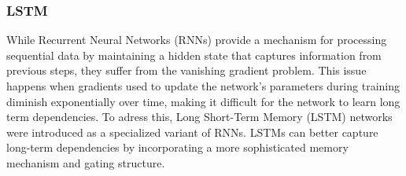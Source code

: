 \documentclass{article}
\begin{document}
\subsubsection{LSTM}

While Recurrent Neural Networks (RNNs) provide a mechanism for processing sequential data by maintaining a hidden state that captures information from previous steps, they suffer from the vanishing gradient problem.
This issue happens when gradients used to update the network's parameters during training diminish exponentially over time, making it difficult for the network to learn long term dependencies.
To adress this, Long Short-Term Memory (LSTM) networks were introduced as a specialized variant of RNNs.
LSTMs can better capture long-term dependencies by incorporating a more sophisticated memory mechanism and gating structure.


%
\end{document}
